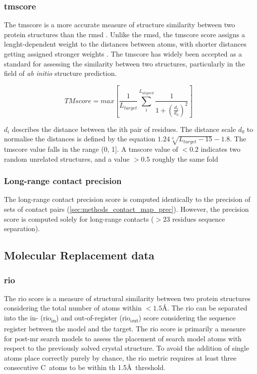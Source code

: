 \subsubsection{\acrlong{tmscore}}
The \gls{tmscore} is a more accurate measure of structure similarity between two protein structures than the \gls{rmsd} \cite{Zhang2004-nn}. Unlike the \gls{rmsd}, the \gls{tmscore} score assigns a lenght-dependent weight to the distances between atoms, with shorter distances getting assigned stronger weights \cite{Zhang2004-nn}. The \gls{tmscore} has widely been accepted as a standard for assessing the similarity between two structures, particularly in the field of \textit{ab initio} structure prediction.

\begin{equation}
TMscore=max\left[\frac{1}{L_{target}}\sum_{i}^{L_{aligned}}{\frac{1}{1+\left(\frac{d_i}{d_0}\right)^2}}\right]
\label{eq:methods_tmscore}
\end{equation}

$d_i$ describes the distance between the ith pair of residues. The distance scale $d_0$ to normalise the distances is defined by the equation $1.24\sqrt[3]{L_{target}-15}-1.8$. The \gls{tmscore} value falls in the range (0, 1]. A \gls{tmscore} value of $<0.2$ indicates two random unrelated structures, and a value $>0.5$ roughly the same fold \cite{Xu2010-sw}

\subsubsection{Long-range contact precision}
The long-range contact precision score is computed identically to the precision of sets of contact pairs (\cref{sec:methods_contact_map_prec}). However, the precision score is computed solely for long-range contacts ($>23$ residues sequence separation).

\subsection{Molecular Replacement data}
\subsubsection{\acrlong{rio}}
The \gls{rio} score \cite{Thomas2015-ag} is a measure of structural similarity between two protein structures considering the total number of atoms within $<1.5$\AA. The \gls{rio} can be separated into the in- (\gls{rio}\textsubscript{in}) and out-of-register (\gls{rio}\textsubscript{out}) score considering the sequence register between the model and the target. The \gls{rio} score is primarily a measure for post-\gls{mr} search models to assess the placement of search model atoms with respect to the previously solved crystal structure. To avoid the addition of single atoms place correctly purely by chance, the \gls{rio} metric requires at least three consecutive C\textalpha\ atoms to be within th 1.5\AA\ threshold.

